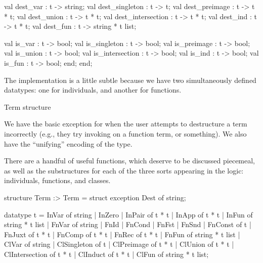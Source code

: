               val dest_var : t -> string;
              val dest_singleton : t -> t;
              val dest_preimage : t -> t * t;
              val dest_union : t -> t * t;
              val dest_intersection : t -> t * t;
              val dest_ind : t -> t * t;
              val dest_fun : t -> string * t list;

              val is_var : t -> bool;
              val is_singleton : t -> bool;
              val is_preimage : t -> bool;
              val is_union : t -> bool;
              val is_intersection : t -> bool;
              val is_ind : t -> bool;
              val is_fun : t -> bool;
            end;
end;
\nwendcode{}\nwdocspar

\begin{node}
The implementation is a little subtle because we have two
simultaneously defined datatypes: one for individuals, and another for
functions. 
\end{node}

\nwenddocs{}\endmoddef\nwstartdeflinemarkup\nwenddeflinemarkup
\LA{}Term structure~{\nwtagstyle{}}\RA{}
\nwendcode{}\nwdocspar

\begin{node}
We have the basic exception for when the user attempts to destructure
a term incorrectly (e.g., they try invoking {\Tt{}\nwendquote} on a
function term, or something). We also have the ``unifying'' encoding
of the {\Tt{}\nwendquote} type.

There are a handful of useful functions, which deserve to be discussed
piecemeal, as well as the substructures for each of the three sorts
appearing in the logic: individuals, functions, and classes.
\end{node}

\nwenddocs{}\endmoddef\nwstartdeflinemarkup{}\nwenddeflinemarkup
structure Term :> Term = struct
exception Dest of string;

datatype t = InVar of string
           | InZero
           | InPair of t * t
           | InApp of t * t
           | InFun of string * t list
           | FnVar of string
           | FnId
           | FnCond
           | FnFst
           | FnSnd
           | FnConst of t
           | FnJuxt of t * t
           | FnComp of t * t
           | FnRec of t * t
           | FnFun of string * t list
           | ClVar of string
           | ClSingleton of t
           | ClPreimage of t * t
           | ClUnion of t * t
           | ClIntersection of t * t
           | ClInduct of t * t
           | ClFun of string * t list;

